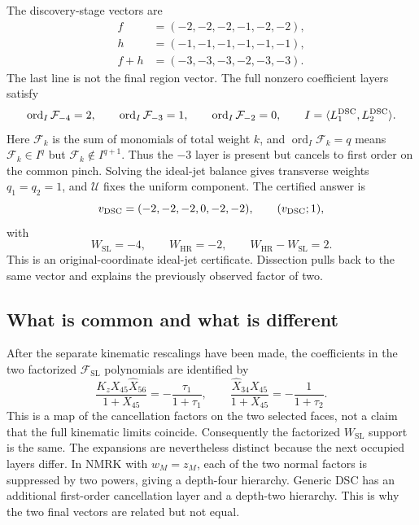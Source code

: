 \documentclass[11pt]{article}
\newcommand{\F}{\mathcal F}
\newcommand{\U}{\mathcal U}
\newcommand{\SL}{\mathrm{SL}}
\newcommand{\HR}{\mathrm{HR}}
\newcommand{\hX}{\widehat X}
\begin{document}
The discovery-stage vectors are
\begin{align}
 f&=(-2,-2,-2,-1,-2,-2),\nonumber\\
 h&=(-1,-1,-1,-1,-1,-1),\nonumber\\
 f+h&=(-3,-3,-3,-2,-3,-3).
 \label{eq:dsc-naive}
\end{align}
The last line is not the final region vector.  The full nonzero coefficient
layers satisfy
\begin{equation}
 \operatorname{ord}_I\F_{-4}=2,\qquad
 \operatorname{ord}_I\F_{-3}=1,\qquad
 \operatorname{ord}_I\F_{-2}=0,\qquad
 I=\langle L_1^{\rm DSC},L_2^{\rm DSC}\rangle.
\label{eq:dsc-ideal-orders}
\end{equation}
Here \(\F_k\) is the sum of monomials of total weight \(k\), and
\(\operatorname{ord}_I\F_k=q\) means
\(\F_k\in I^q\) but \(\F_k\notin I^{q+1}\).
Thus the \(-3\) layer is present but cancels to first order on the common
pinch.  Solving the ideal-jet balance gives transverse weights
\(q_1=q_2=1\), and \(\U\) fixes the uniform component.  The certified answer is
\begin{equation}
 v_{\rm DSC}=(-2,-2,-2,0,-2,-2),\qquad (v_{\rm DSC};1),
 \label{eq:dsc-vector}
\end{equation}
with
\begin{equation}
 W_{\SL}=-4,\qquad W_{\HR}=-2,\qquad
 W_{\HR}-W_{\SL}=2.
 \label{eq:dsc-gap}
\end{equation}
This is an original-coordinate ideal-jet certificate.  Dissection pulls back
to the same vector and explains the previously observed factor of two.

\subsection{What is common and what is different}

After the separate kinematic rescalings have been made, the coefficients in
the two factorized \(\F_{\SL}\) polynomials are identified by
\begin{equation}
 \frac{K_zX_{45}\hX_{56}}{1+X_{45}}=-\frac{\tau_1}{1+\tau_1},
 \qquad
 \frac{\hX_{34}X_{45}}{1+X_{45}}=-\frac{1}{1+\tau_2}.
 \label{eq:factor-map}
\end{equation}
This is a map of the cancellation factors on the two selected faces, not a
claim that the full kinematic limits coincide.  Consequently the factorized
\(W_{\SL}\) support is the same.  The expansions are nevertheless distinct because the
next occupied layers differ.  In NMRK with \(w_M=z_M\), each of the two
normal factors is suppressed by two powers, giving a depth-four hierarchy.
Generic DSC has an additional first-order cancellation layer and a depth-two
hierarchy.  This is why the two final vectors are related but not equal.
\end{document}
